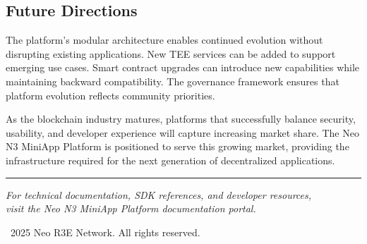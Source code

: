 \documentclass[11pt,a4paper]{article}
\begin{document}
\subsection{Future Directions}

The platform's modular architecture enables continued evolution without disrupting existing applications. New TEE services can be added to support emerging use cases. Smart contract upgrades can introduce new capabilities while maintaining backward compatibility. The governance framework ensures that platform evolution reflects community priorities.

As the blockchain industry matures, platforms that successfully balance security, usability, and developer experience will capture increasing market share. The Neo N3 MiniApp Platform is positioned to serve this growing market, providing the infrastructure required for the next generation of decentralized applications.

\vspace{1cm}
\begin{center}
\rule{0.5\textwidth}{0.4pt}
\end{center}
\vspace{0.5cm}

\begin{center}
\textit{For technical documentation, SDK references, and developer resources,\\visit the Neo N3 MiniApp Platform documentation portal.}
\end{center}

\vspace{1cm}
\begin{center}
{\small \textcopyright\ 2025 Neo R3E Network. All rights reserved.}
\end{center}
\end{document}
